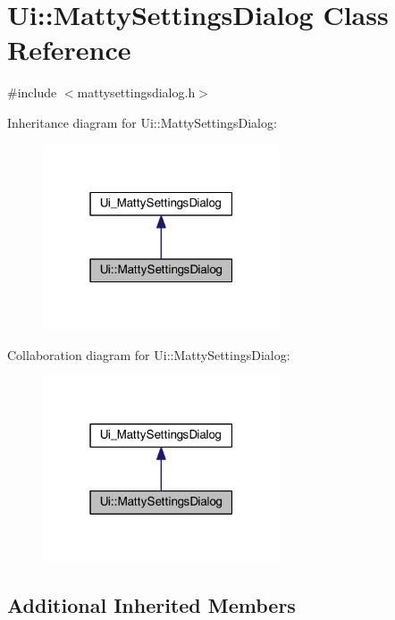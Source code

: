 \hypertarget{classUi_1_1MattySettingsDialog}{}\section{Ui\+:\+:Matty\+Settings\+Dialog Class Reference}
\label{classUi_1_1MattySettingsDialog}


{\ttfamily \#include $<$mattysettingsdialog.\+h$>$}



Inheritance diagram for Ui\+:\+:Matty\+Settings\+Dialog\+:
\nopagebreak
\begin{figure}[H]
\begin{center}
\leavevmode
\includegraphics[width=199pt]{classUi_1_1MattySettingsDialog__inherit__graph}
\end{center}
\end{figure}


Collaboration diagram for Ui\+:\+:Matty\+Settings\+Dialog\+:
\nopagebreak
\begin{figure}[H]
\begin{center}
\leavevmode
\includegraphics[width=199pt]{classUi_1_1MattySettingsDialog__coll__graph}
\end{center}
\end{figure}
\subsection*{Additional Inherited Members}


